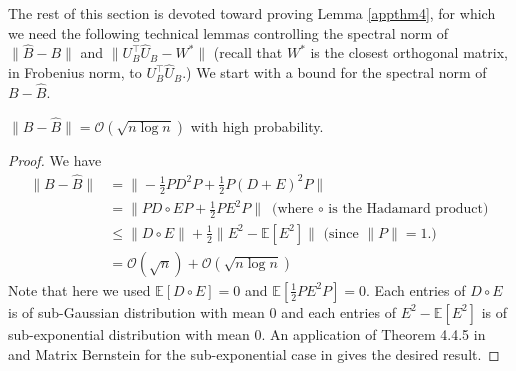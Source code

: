 The rest of this section is devoted toward proving Lemma \ref{appthm4}, for which we need the following technical lemmas controlling the spectral norm of $\|\hat{B} - B\|$ and $\|U_B^{\top} \hat{U}_B - W^{*}\|$ (recall that $W^*$ is the closest orthogonal matrix, in Frobenius norm, to $U_B^{\top} \hat{U}_B$.) 
We start with a bound for the spectral norm of $B - \hat{B}$. 

\begin{proposition}
\label{appthm6}
  $\|B - \hat{B}\| = \mathcal{O}(\sqrt{n \log n})$ with high probability.
\end{proposition}
\begin{proof}
 We have
  \begin{align*}
    \|B - \hat{B}\| & = \| -\frac{1}{2} P D^2 P +  \frac{1}{2} P (D+E)^2 P\|\\
    & = \|P D \circ E P + \frac{1}{2} P E^2 P\| \textrm{ (where $\circ$ is the Hadamard product)}\\      
    & \leq \|D \circ E\| + \frac{1}{2} \| E^2 - \mathbb{E} [E^2] \| \textrm{ (since $\|P\| = 1.)$ }\\
    & = \mathcal{O}(\sqrt{n}) + \mathcal{O}(\sqrt{n \log n})
  \end{align*}
  Note that here we used $\mathbb{E}[D \circ E] = 0$ and $\mathbb{E}[\frac{1}{2}P E^2 P ] = 0$. Each entries of $D \circ E$ is of sub-Gaussian distribution with mean $0$ and each entries of $E^2 - \mathbb{E} [E^2]$ is of sub-exponential distribution with mean $0$. An application of Theorem 4.4.5 in \cite{HDP} and Matrix Bernstein for the sub-exponential case in \cite{tropp2012user} gives the desired result.
\end{proof}

